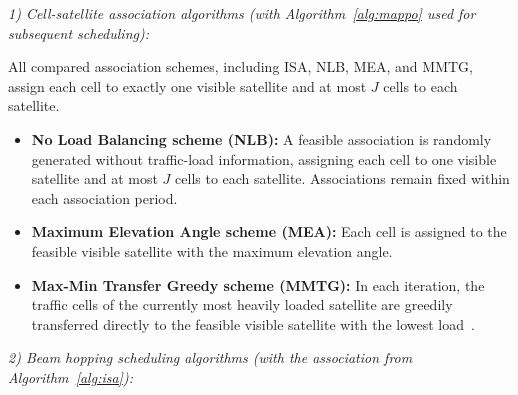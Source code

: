 \documentclass[journal]{IEEEtran}
\begin{document}
\textit{1) Cell-satellite association algorithms (with Algorithm~\ref{alg:mappo} used for subsequent scheduling):}

All compared association schemes, including ISA, NLB, MEA, and MMTG, assign each cell to exactly one visible satellite and at most $J$ cells to each satellite.

\begin{itemize}
    \item \textbf{No Load Balancing scheme (NLB):} A feasible association is randomly generated without traffic-load information, assigning each cell to one visible satellite and at most $J$ cells to each satellite. Associations remain fixed within each association period.
    \item \textbf{Maximum Elevation Angle scheme (MEA):} Each cell is assigned to the feasible visible satellite with the maximum elevation angle.
    \item \textbf{Max-Min Transfer Greedy scheme (MMTG):} In each iteration, the traffic cells of the currently most heavily loaded satellite are greedily transferred directly to the feasible visible satellite with the lowest load~\cite{ref21,ref23}.
\end{itemize}

\textit{2) Beam hopping scheduling algorithms (with the association from Algorithm~\ref{alg:isa}):}
\end{document}

